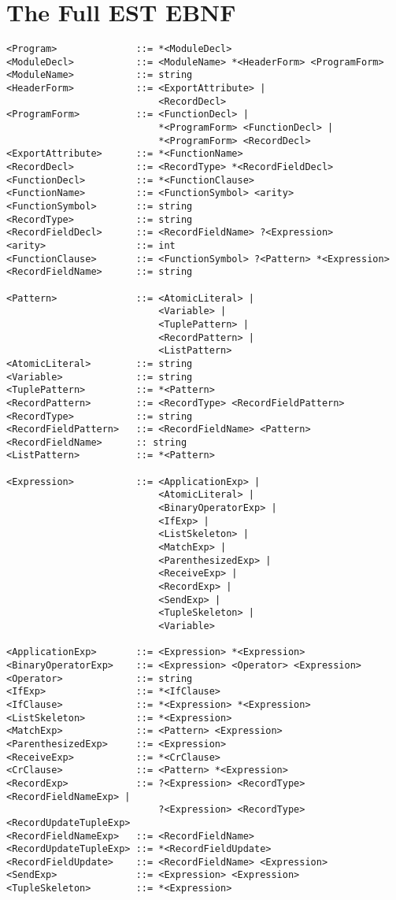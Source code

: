 \chapter{The Full EST EBNF}
\label{app:estebnffull}

\footnotesize
\begin{verbatim}
<Program>              ::= *<ModuleDecl>
<ModuleDecl>           ::= <ModuleName> *<HeaderForm> <ProgramForm> 
<ModuleName>           ::= string
<HeaderForm>           ::= <ExportAttribute> | 
                           <RecordDecl>
<ProgramForm>          ::= <FunctionDecl> |
                           *<ProgramForm> <FunctionDecl> |
                           *<ProgramForm> <RecordDecl> 
<ExportAttribute>      ::= *<FunctionName>
<RecordDecl>           ::= <RecordType> *<RecordFieldDecl>
<FunctionDecl>         ::= *<FunctionClause>  
<FunctionName>         ::= <FunctionSymbol> <arity>
<FunctionSymbol>       ::= string
<RecordType>           ::= string
<RecordFieldDecl>      ::= <RecordFieldName> ?<Expression>
<arity>                ::= int
<FunctionClause>       ::= <FunctionSymbol> ?<Pattern> *<Expression>
<RecordFieldName>      ::= string

<Pattern>              ::= <AtomicLiteral> |
                           <Variable> |
                           <TuplePattern> |
                           <RecordPattern> |
                           <ListPattern>
<AtomicLiteral>        ::= string
<Variable>             ::= string
<TuplePattern>         ::= *<Pattern>
<RecordPattern>        ::= <RecordType> <RecordFieldPattern>
<RecordType>           ::= string
<RecordFieldPattern>   ::= <RecordFieldName> <Pattern>
<RecordFieldName>      :: string
<ListPattern>          ::= *<Pattern>

<Expression>           ::= <ApplicationExp> |
                           <AtomicLiteral> |
                           <BinaryOperatorExp> |
                           <IfExp> |
                           <ListSkeleton> |
                           <MatchExp> |
                           <ParenthesizedExp> |
                           <ReceiveExp> |
                           <RecordExp> |
                           <SendExp> |
                           <TupleSkeleton> |
                           <Variable> 

<ApplicationExp>       ::= <Expression> *<Expression>
<BinaryOperatorExp>    ::= <Expression> <Operator> <Expression>
<Operator>             ::= string
<IfExp>                ::= *<IfClause>
<IfClause>             ::= *<Expression> *<Expression>
<ListSkeleton>         ::= *<Expression>
<MatchExp>             ::= <Pattern> <Expression>
<ParenthesizedExp>     ::= <Expression>
<ReceiveExp>           ::= *<CrClause>
<CrClause>             ::= <Pattern> *<Expression>
<RecordExp>            ::= ?<Expression> <RecordType> <RecordFieldNameExp> |
                           ?<Expression> <RecordType> <RecordUpdateTupleExp>
<RecordFieldNameExp>   ::= <RecordFieldName> 
<RecordUpdateTupleExp> ::= *<RecordFieldUpdate>
<RecordFieldUpdate>    ::= <RecordFieldName> <Expression>
<SendExp>              ::= <Expression> <Expression>
<TupleSkeleton>        ::= *<Expression>
\end{verbatim}
\normalsize